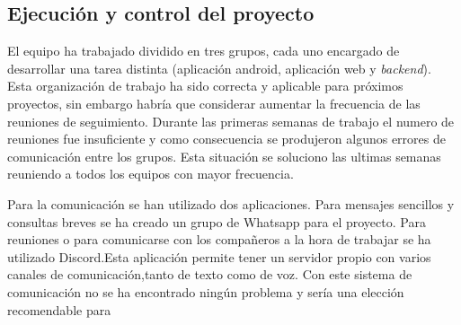 \documentclass{article}
\begin{document}
\subsection{Ejecución y control del proyecto}

El equipo ha trabajado dividido en tres grupos, cada uno encargado de desarrollar una tarea distinta (aplicación android, aplicación web y \textit{backend}). Esta organización de trabajo ha sido correcta y aplicable para próximos proyectos, sin embargo habría que considerar aumentar la frecuencia de las reuniones de seguimiento. Durante las primeras semanas de trabajo el numero de reuniones fue insuficiente y como consecuencia se produjeron algunos errores de comunicación entre los grupos. Esta situación se soluciono las ultimas semanas reuniendo a todos los equipos con mayor frecuencia.

Para la comunicación se han utilizado dos aplicaciones. Para mensajes sencillos y consultas breves se ha creado un grupo de Whatsapp para el proyecto. Para reuniones o para comunicarse con los compañeros a la hora de trabajar se ha utilizado Discord.Esta aplicación permite tener un servidor propio con varios canales de comunicación,tanto de texto como de voz. Con este sistema de comunicación no se ha encontrado ningún problema y sería una elección recomendable para 
\end{document}
